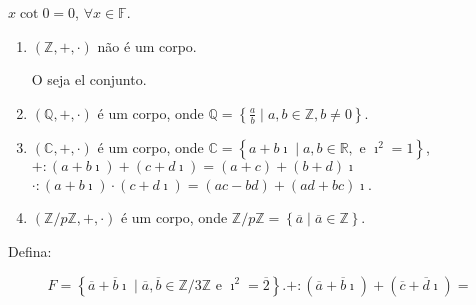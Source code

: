\begin{proposition}
	$x\cot0=0$, $\forall x\in\mathbb{F}$.
\end{proposition}

\begin{example}
	\begin{enumerate}
		\item

		      $\left(\mathbb{Z},+,\cdot\right)$ não é um corpo.

		      O seja el conjunto.

		\item

		      $\left(\mathbb{Q},+,\cdot\right)$ é um corpo, onde
		      $\mathbb{Q}=\left\{\frac{a}{b}\mid a,b\in\mathbb{Z},b\neq0\right\}$.

		\item

		      $\left(\mathbb{C},+,\cdot\right)$ é um corpo, onde
		      $\mathbb{C}=\left\{a+b\imath\mid a,b\in\mathbb{R},\text{ e }\imath^{2}=1\right\}$,
		      $+\colon\left(a+b\imath\right)+\left(c+d\imath\right)=\left(a+c\right)+\left(b+d\right)\imath$
		      $\cdot\colon\left(a+b\imath\right)\cdot\left(c+d\imath\right)=\left(ac-bd\right)+\left(ad+bc\right)\imath$.

		\item

		      $\left(\mathbb{Z}/p\mathbb{Z},+,\cdot\right)$ é um corpo, onde $\mathbb{Z}/p\mathbb{Z}=\left\{\overline{a}\mid \overline{a}\in\mathbb{Z}\right\}$.
	\end{enumerate}
\end{example}

Defina:

$$
	F=
	\left\{
	\overline{a}+\overline{b}\imath\mid
	\overline{a},\overline{b}\in\mathbb{Z}/3\mathbb{Z}
	\text{ e }\imath^{2}=\overline{2}
	\right\}.
	+\colon
	\left(\overline{a}+\overline{b}\imath\right)+
	\left(\overline{c}+\overline{d}\imath\right)=
$$

